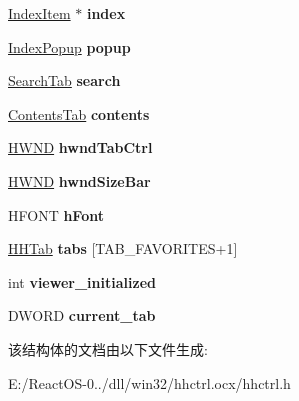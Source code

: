 \begin{DoxyCompactItemize}
\hyperlink{struct_index_item}{Index\+Item} $\ast$ {\bfseries index}
\item 
\mbox{\label{struct_h_h_info_a081778a151a4c82e3dfb350de57536df}} 
\hyperlink{struct_index_popup}{Index\+Popup} {\bfseries popup}
\item 
\mbox{\label{struct_h_h_info_ad99257ffea7aa795ee696a96cf846821}} 
\hyperlink{struct_search_tab}{Search\+Tab} {\bfseries search}
\item 
\mbox{\label{struct_h_h_info_aee47c24a64b036715ef695f3ef02c63a}} 
\hyperlink{struct_contents_tab}{Contents\+Tab} {\bfseries contents}
\item 
\mbox{\label{struct_h_h_info_a3be6e9dc7012c8b47de915b9a5e51a00}} 
\hyperlink{interfacevoid}{H\+W\+ND} {\bfseries hwnd\+Tab\+Ctrl}
\item 
\mbox{\label{struct_h_h_info_ad31677ce96138f337c3009414bc07c92}} 
\hyperlink{interfacevoid}{H\+W\+ND} {\bfseries hwnd\+Size\+Bar}
\item 
\mbox{\label{struct_h_h_info_adab689999abc7577d6f72427bcee3799}} 
H\+F\+O\+NT {\bfseries h\+Font}
\item 
\mbox{\label{struct_h_h_info_a26aeaa24a4e16e90945f6185f99ac389}} 
\hyperlink{struct_h_h_tab}{H\+H\+Tab} {\bfseries tabs} \mbox{[}T\+A\+B\+\_\+\+F\+A\+V\+O\+R\+I\+T\+ES+1\mbox{]}
\item 
\mbox{\label{struct_h_h_info_a1eaa6e006842279d842b067e5d8d047e}} 
int {\bfseries viewer\+\_\+initialized}
\item 
\mbox{\label{struct_h_h_info_a8e9731b65985e0044dbb091167b17161}} 
D\+W\+O\+RD {\bfseries current\+\_\+tab}
\end{DoxyCompactItemize}


该结构体的文档由以下文件生成\+:\begin{DoxyCompactItemize}
\item 
E\+:/\+React\+O\+S-\/0../dll/win32/hhctrl.\+ocx/hhctrl.\+h\end{DoxyCompactItemize}
